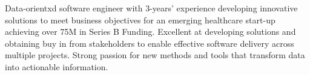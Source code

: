 

\begin{cvparagraph}


Data-orientxd software engineer with 3-years’ experience developing innovative solutions to meet business objectives for an emerging healthcare start-up achieving over 75M in Series B Funding. Excellent at developing solutions and obtaining buy in from stakeholders to enable effective software delivery across multiple projects. Strong passion for new methods and tools that transform data into actionable information.
\end{cvparagraph}
